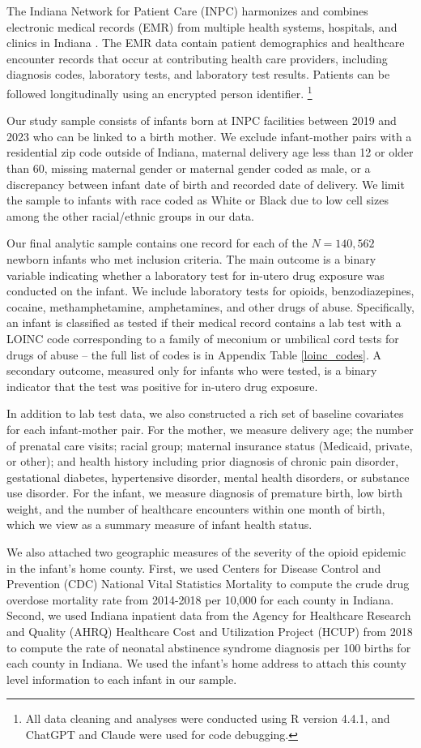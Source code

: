 The Indiana Network for Patient Care (INPC) harmonizes and combines electronic medical records (EMR) from multiple health systems, hospitals, and clinics in Indiana \citep{regenstrief2023}. The EMR data contain patient demographics and healthcare encounter records that occur at contributing health care providers, including diagnosis codes, laboratory tests, and laboratory test results. Patients can be followed longitudinally using an encrypted person identifier. \footnote{All data cleaning and analyses were conducted using R version 4.4.1, and ChatGPT and Claude were used for code debugging. }

Our study sample consists of infants born at INPC facilities between 2019 and 2023 who can be linked to a birth mother. We exclude infant-mother pairs with a residential zip code outside of Indiana, maternal delivery age less than 12 or older than 60, missing maternal gender or maternal gender coded as male, or a discrepancy between infant date of birth and recorded date of delivery. We limit the sample to infants with race coded as White or Black due to low cell sizes among the other racial/ethnic groups in our data.

Our final analytic sample contains one record for each of the $N = 140,562$ newborn infants who met inclusion criteria. The main outcome is a binary variable indicating whether a laboratory test for in-utero drug exposure was conducted on the infant. We include laboratory tests for opioids, benzodiazepines, cocaine, methamphetamine, amphetamines, and other drugs of abuse. Specifically, an infant is classified as tested if their medical record contains a lab test with a LOINC code corresponding to a family of meconium or umbilical cord tests for drugs of abuse -- the full list of codes is in Appendix Table \ref{loinc_codes}. A secondary outcome, measured only for infants who were tested, is a binary indicator that the test was positive for in-utero drug exposure. 

In addition to lab test data, we also constructed a rich set of baseline covariates for each infant-mother pair. For the mother, we measure delivery age; the number of prenatal care visits; racial group; maternal insurance status (Medicaid, private, or other); and health history including prior diagnosis of chronic pain disorder, gestational diabetes, hypertensive disorder, mental health disorders, or substance use disorder. For the infant, we measure diagnosis of premature birth, low birth weight, and the number of healthcare encounters within one month of birth, which we view as a summary measure of infant health status. 

We also attached two geographic measures of the severity of the opioid epidemic in the infant's home county. First, we used Centers for Disease Control and Prevention (CDC) National Vital Statistics Mortality to compute the crude drug overdose mortality rate from 2014-2018 per 10,000 for each county in Indiana. Second, we used Indiana inpatient data from the Agency for Healthcare Research and Quality (AHRQ) Healthcare Cost and Utilization Project (HCUP) from 2018 to compute the rate of neonatal abstinence syndrome diagnosis per 100 births for each county in Indiana. We used the infant's home address to attach this county level information to each infant in our sample.
